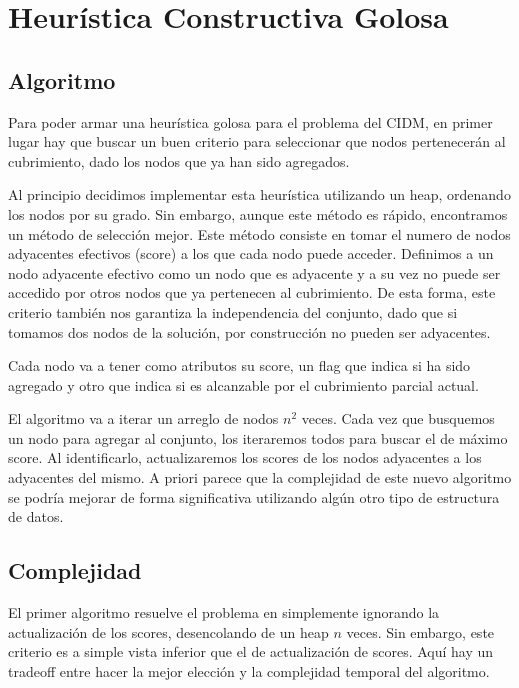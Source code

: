 \section{Heurística Constructiva Golosa}

\subsection{Algoritmo}

Para poder armar una heurística golosa para el problema del CIDM, en primer lugar hay que buscar un buen criterio para seleccionar que nodos pertenecerán al cubrimiento, dado los nodos que ya han sido agregados.

Al principio decidimos implementar esta heurística utilizando un heap, ordenando los nodos por su grado. Sin embargo, aunque este método es rápido, encontramos un método de selección mejor. Este método consiste en tomar el numero de nodos adyacentes efectivos (score) a los que cada nodo puede acceder. Definimos a un nodo adyacente efectivo como un nodo que es adyacente y a su vez no puede ser accedido por otros nodos que ya pertenecen al cubrimiento. De esta forma, este criterio también nos garantiza la independencia del conjunto, dado que si tomamos dos nodos de la solución, por construcción no pueden ser adyacentes.

Cada nodo va a tener como atributos su score, un flag que indica si ha sido agregado y otro que indica si es alcanzable por el cubrimiento parcial actual.

El algoritmo va a iterar un arreglo de nodos $n^2$ veces. Cada vez que busquemos un nodo para agregar al conjunto, los iteraremos todos para buscar el de máximo score. Al identificarlo, actualizaremos los scores de los nodos adyacentes a los adyacentes del mismo. A priori parece que la complejidad de este nuevo algoritmo se podría mejorar de forma significativa utilizando algún otro tipo de estructura de datos.

\subsection{Complejidad}

El primer algoritmo resuelve el problema en  simplemente ignorando la actualización de los scores, desencolando de un heap $n$ veces. Sin embargo, este criterio es a simple vista inferior que el de actualización de scores. Aquí hay un tradeoff entre hacer la mejor elección y la complejidad temporal del algoritmo.

